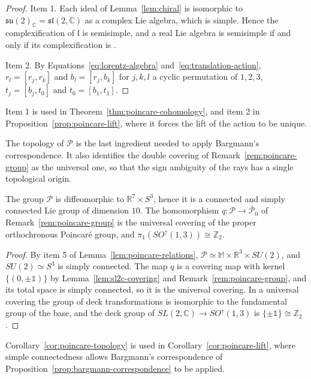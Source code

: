 \begin{proof}
	Item 1. Each ideal of Lemma~\ref{lem:chiral} is isomorphic to $\mathfrak{su}(2)_{\mathbb{C}}=\mathfrak{sl}(2,\mathbb{C})$ as a complex Lie algebra, which is simple. Hence the complexification of $\mathfrak{l}$ is semisimple, and a real Lie algebra is semisimple if and only if its complexification is \cite[TODO-location]{TODO-Hum10}.
	
	Item 2. By Equations~\eqref{eq:lorentz-algebra} and~\eqref{eq:translation-action}, $r_l=[r_j,r_k]$ and $b_l=[r_j,b_k]$ for $j,k,l$ a cyclic permutation of $1,2,3$, $t_j=[b_j,t_0]$ and $t_0=[b_1,t_1]$.
\end{proof}

\noindent Item 1 is used in Theorem~\ref{thm:poincare-cohomology}, and item 2 in Proposition~\ref{prop:poincare-lift}, where it forces the lift of the action to be unique.

The topology of $\mathcal{P}$ is the last ingredient needed to apply Bargmann's correspondence. It also identifies the double covering of Remark~\ref{rem:poincare-group} as the universal one, so that the sign ambiguity of the rays has a single topological origin.

\begin{corollary}\label{cor:poincare-topology}
	The group $\mathcal{P}$ is diffeomorphic to $\mathbb{R}^7\times S^3$, hence it is a connected and simply connected Lie group of dimension $10$. The homomorphism $q:\mathcal{P}\to\bar{\mathcal{P}}_0$ of Remark~\ref{rem:poincare-group} is the universal covering of the proper orthochronous Poincar\'e group, and $\pi_1(SO^\uparrow(1,3))\cong\mathbb{Z}_2$.
\end{corollary}

\begin{proof}
	By item 5 of Lemma~\ref{lem:poincare-relations}, $\mathcal{P}\simeq\mathbb{M}\times\mathbb{R}^3\times SU(2)$, and $SU(2)\simeq S^3$ is simply connected. The map $q$ is a covering map with kernel $\{(0,\pm\mathbb{1})\}$ by Lemma~\ref{lem:sl2c-covering} and Remark~\ref{rem:poincare-group}, and its total space is simply connected, so it is the universal covering. In a universal covering the group of deck transformations is isomorphic to the fundamental group of the base, and the deck group of $SL(2,\mathbb{C})\to SO^\uparrow(1,3)$ is $\{\pm\mathbb{1}\}\cong\mathbb{Z}_2$.
\end{proof}

\noindent Corollary~\ref{cor:poincare-topology} is used in Corollary~\ref{cor:poincare-lift}, where simple connectedness allows Bargmann's correspondence of Proposition~\ref{prop:bargmann-correspondence} to be applied.

